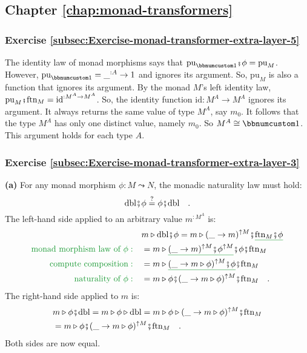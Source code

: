 \subsection*{Chapter \ref{chap:monad-transformers}}

\subsubsection*{Exercise \ref{subsec:Exercise-monad-transformer-extra-layer-5}}

The identity law of monad morphisms says that $\text{pu}_{\bbnum 1}\bef\phi=\text{pu}_{M}$.
However, $\text{pu}_{\bbnum 1}=\_^{:A}\rightarrow1$ and ignores its
argument. So, $\text{pu}_{M}$ is also a function that ignores its
argument. By the monad $M$\textsf{'}s left identity law, $\text{pu}_{M}\bef\text{ftn}_{M}=\text{id}^{:M^{A}\rightarrow M^{A}}$.
So, the identity function $\text{id}:M^{A}\rightarrow M^{A}$ ignores
its argument. It always returns the same value of type $M^{A}$, say
$m_{0}$. It follows that the type $M^{A}$ has only one distinct
value, namely $m_{0}$. So $M^{A}\cong\bbnum 1$. This argument holds
for each type $A$. 

\subsubsection*{Exercise \ref{subsec:Exercise-monad-transformer-extra-layer-3}}

\textbf{(a)} For any monad morphism $\phi:M\leadsto N$, the monadic
naturality law must hold:
\[
\text{dbl}\bef\phi\overset{?}{=}\phi\bef\text{dbl}\quad.
\]
The left-hand side applied to an arbitrary value $m^{:M^{A}}$ is:
\begin{align*}
 & m\triangleright\text{dbl}\bef\phi=m\triangleright(\_\rightarrow m)^{\uparrow M}\bef\gunderline{\text{ftn}_{M}\bef\phi}\\
{\color{greenunder}\text{monad morphism law of }\phi:}\quad & =m\triangleright\gunderline{(\_\rightarrow m)^{\uparrow M}\bef\phi^{\uparrow M}}\bef\phi\bef\text{ftn}_{M}\\
{\color{greenunder}\text{compute composition}:}\quad & =m\triangleright\gunderline{(\_\rightarrow m\triangleright\phi)^{\uparrow M}\bef\phi}\bef\text{ftn}_{M}\\
{\color{greenunder}\text{naturality of }\phi:}\quad & =m\triangleright\phi\bef(\_\rightarrow m\triangleright\phi)^{\uparrow M}\bef\text{ftn}_{M}\quad.
\end{align*}
The right-hand side applied to $m$ is:
\begin{align*}
 & m\triangleright\phi\bef\text{dbl}=m\triangleright\phi\triangleright\text{dbl}=m\triangleright\phi\triangleright(\_\rightarrow m\triangleright\phi)^{\uparrow M}\bef\text{ftn}_{M}\\
 & =m\triangleright\phi\bef(\_\rightarrow m\triangleright\phi)^{\uparrow M}\bef\text{ftn}_{M}\quad.
\end{align*}
Both sides are now equal.

